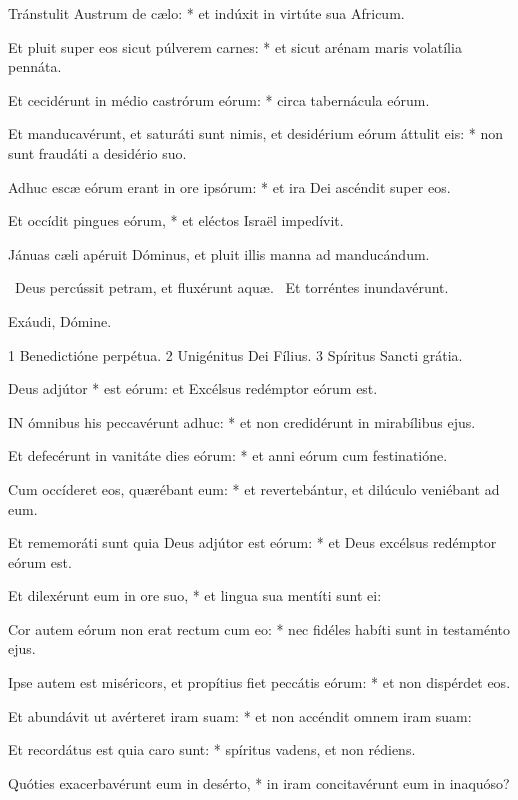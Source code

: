 Tránstulit Austrum de cælo: * et indúxit in virtúte sua Africum.

Et pluit super eos sicut púlverem carnes: * et sicut arénam maris volatília pennáta.

Et cecidérunt in médio castrórum eórum: * circa tabernácula eórum.

Et manducavérunt, et saturáti sunt nimis, et desidérium eórum áttulit eis: * non sunt fraudáti a desidério suo.

Adhuc escæ eórum erant in ore ipsórum: * et ira Dei ascéndit super eos.

Et occídit pingues eórum, * et eléctos Israël impedívit.

 Jánuas cæli apéruit Dóminus, et pluit illis manna ad manducándum.


\V\ Deus percússit petram, et fluxérunt aquæ. \R\ Et torréntes inundavérunt.

 Exáudi, Dómine.

 1 Benedictióne perpétua. 2 Unigénitus Dei Fílius. 3 Spíritus Sancti grátia.


 Deus adjútor * est eórum: et Excélsus redémptor eórum est.


\lettrine[lines=2]{I}{N} ómnibus his peccavérunt adhuc: * et non credidérunt in mirabílibus ejus.

Et defecérunt in vanitáte dies eórum: * et anni eórum cum festinatióne.

Cum occíderet eos, quærébant eum: * et revertebántur, et dilúculo veniébant ad eum.

Et rememoráti sunt quia Deus adjútor est eórum: * et Deus excélsus redémptor eórum est.

Et dilexérunt eum in ore suo, * et lingua sua mentíti sunt ei:

Cor autem eórum non erat rectum cum eo: * nec fidéles habíti sunt in testaménto ejus.

Ipse autem est miséricors, et propítius fiet peccátis eórum: * et non dispérdet eos.

Et abundávit ut avérteret iram suam: * et non accéndit omnem iram suam:

Et recordátus est quia caro sunt: * spíritus vadens, et non rédiens.

Quóties exacerbavérunt eum in desérto, * in iram concitavérunt eum in inaquóso?

